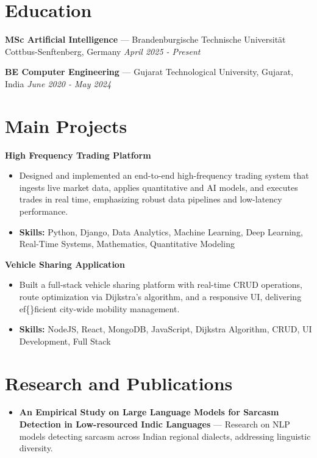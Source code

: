\documentclass[a4paper,10pt]{article}
\begin{document}
\section*{Education}
\textbf{MSc Artificial Intelligence} — Brandenburgische Technische Universität Cottbus-Senftenberg, Germany \hfill \textit{April 2025 - Present}\par
\vspace{1.5pt}
\textbf{BE Computer Engineering} — Gujarat Technological University, Gujarat, India \hfill \textit{June 2020 - May 2024}\par

\section*{Main Projects}
\textbf{High Frequency Trading Platform}\par
\vspace{1pt}
\begin{itemize}
  \item Designed and implemented an end-to-end high-frequency trading system that ingests live market data, applies quantitative and AI models, and executes trades in real time, emphasizing robust data pipelines and low-latency performance.
  \item \textbf{Skills:} Python, Django, Data Analytics, Machine Learning, Deep Learning, Real-Time Systems, Mathematics, Quantitative Modeling
\end{itemize}
\vspace{3pt}
\textbf{Vehicle Sharing Application}\par
\vspace{1pt}
\begin{itemize}
  \item Built a full-stack vehicle sharing platform with real-time CRUD operations, route optimization via Dijkstra's algorithm, and a responsive UI, delivering ef\{\}ficient city-wide mobility management.
  \item \textbf{Skills:} NodeJS, React, MongoDB, JavaScript, Dijkstra Algorithm, CRUD, UI Development, Full Stack
\end{itemize}

\section*{Research and Publications}
\begin{itemize}
\item \textbf{An Empirical Study on Large Language Models for Sarcasm Detection in Low-resourced Indic Languages} — Research on NLP models detecting sarcasm across Indian regional dialects, addressing linguistic diversity.
\end{itemize}
\end{document}
